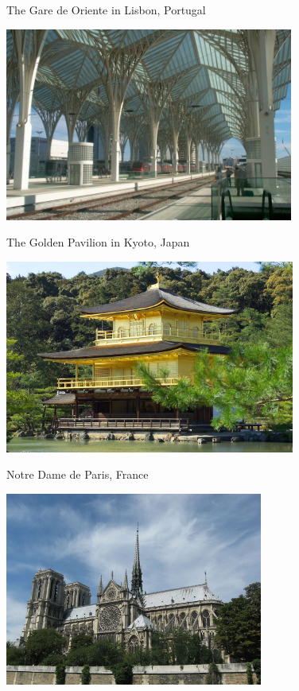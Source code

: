 \begin{frame}[fragile]{The Gare de Oriente in Lisbon, Portugal}
\begin{center}
  \includegraphics[height=180pt]{OrienteStationLisboa.jpg}
\end{center}
\end{frame}

\begin{frame}[fragile]{The Golden Pavilion in Kyoto, Japan}
\begin{center}
  \includegraphics[height=180pt]{Kinkaku.jpg}
\end{center}
\end{frame}

\begin{frame}[fragile]{Notre Dame de Paris, France}
\begin{center}
  \includegraphics[height=180pt]{NotredameParis.jpg}
\end{center}
\end{frame}

